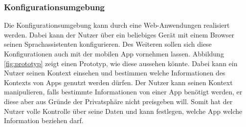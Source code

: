 \subsubsection{Konfigurationsumgebung}
Die Konfigurationsumgebung kann durch eine Web-Anwendungen realisiert werden. Dabei kann der Nutzer über ein beliebiges Gerät mit einem Browser seinen Sprachassistenten konfigurieren. Des Weiteren sollen sich diese Konfigurationen auch mit der mobilen App vornehmen lassen. Abbildung \ref{fig:prototyp} zeigt einen Prototyp, wie diese aussehen könnte. Dabei kann ein Nutzer seinen Kontext einsehen und bestimmen welche Informationen des Kontexts von Apps genutzt werden dürfen. Der Nutzer kann seinen Kontext manipulieren, falls bestimmte Informationen von einer App benötigt werden, er diese aber aus Gründe der Privatsphäre nicht preisgeben will. Somit hat der Nutzer volle Kontrolle über seine Daten und kann festlegen, welche App welche Information beziehen darf. 


